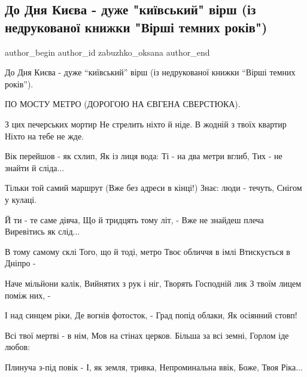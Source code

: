  
 
 
 
 
 
\subsection{До Дня Києва - дуже "київський" вірш (із недрукованої книжки "Вірші темних років")}
\label{sec:30_05_2021.fb.zabuzhko_oksana.1.den_kieva_stih}
\ifcmt
 author_begin
   author_id zabuzhko_oksana
 author_end
\fi

До Дня Києва - дуже \enquote{київський} вірш (із недрукованої книжки \enquote{Вірші темних років}).

ПО МОСТУ МЕТРО (ДОРОГОЮ НА ЄВГЕНА СВЕРСТЮКА).

З цих печерських мортир
Не стрелить ніхто й ніде.
В жодній з твоїх квартир
Ніхто на тебе не жде.

Вік перейшов - як схлип, 
Як із лиця вода:
Ті - на два метри вглиб, 
Тих - не знайти й сліда...

Тільки той самий маршрут
(Вже без адреси в кінці!)
Знає: люди - течуть, 
Снігом у кулаці.

Й ти - те саме дівча,
Що й тридцять тому літ, -
Вже не знайдеш плеча
Виревітись як слід...

В тому самому склі
Того, що й тоді, метро
Твоє обличчя в імлі
Втискується в Дніпро -

Наче мільйони калік,
Вийнятих з рук і ніг,
Творять Господній лик
З твоїм лицем поміж них, -

І над синцем ріки,
Де вогнів фотосток, -
Град попід облаки,
Як осіянний стовп!

Всі твої мертві - в нім,
Мов на стінах церков.
Більша за всі земні,
Горлом іде любов:

Плинуча з-під повік -
І, як земля, тривка,
Непроминальна ввік,
Боже, Твоя Ріка...

